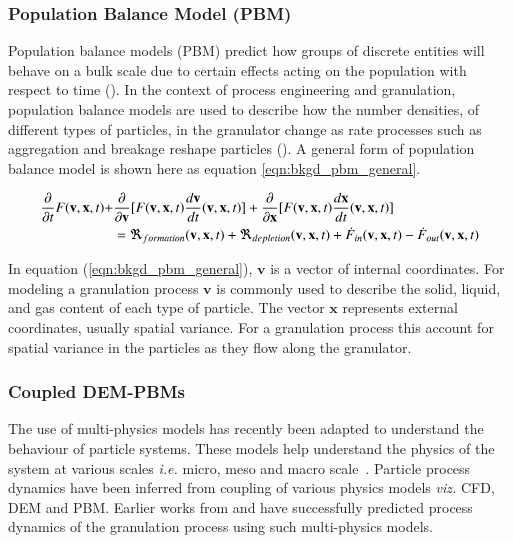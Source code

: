 \documentclass[preprint,11pt,authoryear]{elsarticle}
\begin{document}
\subsubsection{Population Balance Model (PBM)}
     Population balance models (PBM) predict how groups of discrete entities will behave on a 
    bulk scale due to certain effects acting on the population with respect to time 
    (\cite{ramkrishna2014}). In the context of process engineering and granulation, population 
    balance models are used to describe how the number densities, of different types of particles, in 
    the granulator change as rate processes such as aggregation and breakage reshape particles 
    (\cite{Barrasso2013}). A general form of population balance model is shown here as equation 
    \ref{eqn:bkgd_pbm_general}.
    
    \begin{align}
    \frac{ \partial}{\partial t}F(\textbf{v},\textbf{x},t) +& \frac{\partial}{\partial 
        \textbf{v}}[F(\textbf{v},\textbf{x},t)\frac{d\textbf{v}}{dt}(\textbf{v},\textbf{x},t)] + 
    \frac{\partial}{\partial \textbf{x}}[F(\textbf{v},\textbf{x},t)\frac{d\textbf{x}}{dt}(\textbf{v},\textbf{x},t)] 
    \notag\\
    &= 
    \Re_{formation}(\textbf{v},\textbf{x},t)+\Re_{depletion}(\textbf{v},\textbf{x},t)+\dot{F}_{in}(\textbf{v},
    \textbf{x},t)-\dot{F}_{out}(\textbf{v},\textbf{x},t)
    \label{eqn:bkgd_pbm_general} 
    \end{align}
    
In equation (\ref{eqn:bkgd_pbm_general}), $\textbf{v}$ is a vector of internal coordinates. For 
modeling a granulation process $\textbf{v}$ is commonly used to describe the solid, liquid, and gas 
content of each type of particle. The vector $\textbf{x}$ represents external coordinates, usually 
spatial variance. For a granulation process this  account for spatial variance in the particles as they 
flow along the granulator.

\subsubsection{Coupled DEM-PBMs}
The use of multi-physics models has recently been adapted to understand the behaviour of 
particle systems. These models help understand the physics of the system at various scales 
\textit{i.e.} micro, meso and macro scale~\citep{sen2014}. Particle process dynamics have been 
inferred from coupling of various physics models \textit{viz.} CFD, 
DEM and PBM. Earlier works from \cite{sen2014} and \cite{Barrasso2015cerd} have successfully 
predicted process dynamics of the granulation process using such multi-physics models.
\end{document}
